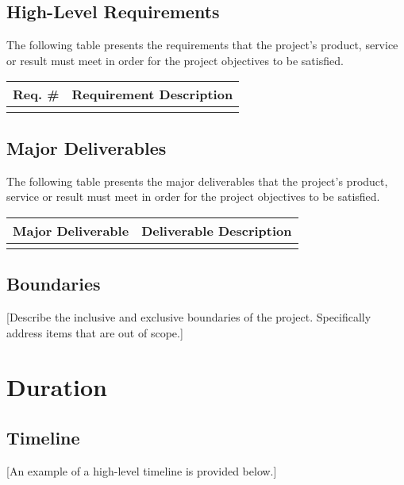 \documentclass[11pt]{article}
\begin{document}
\subsection{High-Level Requirements}
\label{sec:org3131642}
The following table presents the requirements that the project’s product, service or result must meet in order for the project objectives to be satisfied.  

\begin{center}
\begin{tabular}{ll}
Req. \# & Requirement Description\\
\hline
 & \\
\end{tabular}
\end{center}

\subsection{Major Deliverables}
\label{sec:org454b9eb}
The following table presents the major deliverables that the project’s product, service or result must meet in order for the project objectives to be satisfied.

\begin{center}
\begin{tabular}{ll}
Major Deliverable & Deliverable Description\\
\hline
 & \\
\end{tabular}
\end{center}


\subsection{Boundaries}
\label{sec:org7a44f18}
[Describe the inclusive and exclusive boundaries of the project.  Specifically address items that are out of scope.]
\section{Duration}
\label{sec:orgc50db91}
\subsection{Timeline}
\label{sec:orge2608d5}
[An example of a high-level timeline is provided below.]
\end{document}
